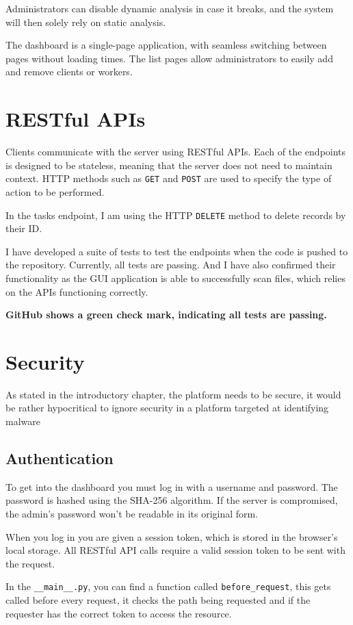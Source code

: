Administrators can disable dynamic analysis in case it breaks,
and the system will then solely rely on static analysis.

The dashboard is a single-page application,
with seamless switching between pages without loading times.
The list pages allow administrators to easily
add and remove clients or workers.

\section{RESTful APIs}
Clients communicate with the server using RESTful APIs.
Each of the endpoints is designed to be stateless,
meaning that the server does not need to maintain context.
HTTP methods such as \texttt{GET} and \texttt{POST} are used
to specify the type of action to be performed.

In the tasks endpoint, I am using the HTTP \texttt{DELETE}
method to delete records by their ID.

I have developed a suite of tests to test
the endpoints when the code is pushed to the repository.
Currently, all tests are passing. And I have also confirmed their functionality
as the GUI application is able to successfully scan files,
which relies on the APIs functioning correctly.

\textbf{GitHub shows a green check mark,
indicating all tests are passing.}

\section{Security}
As stated in the introductory chapter,
the platform needs to be secure,
it would be rather hypocritical to ignore security in a
platform targeted at identifying malware

\subsection{Authentication}
To get into the dashboard you must log in with a username and password.
The password is hashed using the SHA-256 algorithm.
If the server is compromised,
the admin's password won't be readable in its original form.

When you log in you are given a session token,
which is stored in the browser's local storage.
All RESTful API calls require a valid session token to be sent with the request.

In the \texttt{\_\_main\_\_.py}, you can find a function
called \texttt{before\_request},
this gets called before every request, it checks the path being requested
and if the requester has the correct token to access the resource.

